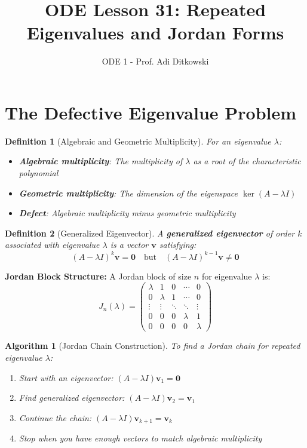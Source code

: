 \documentclass[12pt]{article}
\title{ODE Lesson 31: Repeated Eigenvalues and Jordan Forms}
\author{ODE 1 - Prof. Adi Ditkowski}
\date{}
\newtheorem{definition}{Definition}
\newtheorem{algorithm}{Algorithm}
\begin{document}
\maketitle

\section{The Defective Eigenvalue Problem}

\begin{definition}[Algebraic and Geometric Multiplicity]
For an eigenvalue $\lambda$:
\begin{itemize}
\item \textbf{Algebraic multiplicity}: The multiplicity of $\lambda$ as a root of the characteristic polynomial
\item \textbf{Geometric multiplicity}: The dimension of the eigenspace $\ker(A - \lambda I)$
\item \textbf{Defect}: Algebraic multiplicity minus geometric multiplicity
\end{itemize}
\end{definition}

\begin{definition}[Generalized Eigenvector]
A \textbf{generalized eigenvector} of order $k$ associated with eigenvalue $\lambda$ is a vector $\mathbf{v}$ satisfying:
\[(A - \lambda I)^{k} \mathbf{v} = \mathbf{0} \quad \text{but} \quad (A - \lambda I)^{k-1} \mathbf{v} \neq \mathbf{0}\]
\end{definition}

\begin{keypoint}
\textbf{Jordan Block Structure:}
A Jordan block of size $n$ for eigenvalue $\lambda$ is:
\[J_{n}(\lambda) = \begin{pmatrix}
\lambda & 1 & 0 & \cdots & 0 \\
0 & \lambda & 1 & \cdots & 0 \\
\vdots & \vdots & \ddots & \ddots & \vdots \\
0 & 0 & 0 & \lambda & 1 \\
0 & 0 & 0 & 0 & \lambda
\end{pmatrix}\]
\end{keypoint}

\begin{algorithm}[Jordan Chain Construction]
To find a Jordan chain for repeated eigenvalue $\lambda$:
\begin{enumerate}
\item Start with an eigenvector: $(A - \lambda I)\mathbf{v}_{1} = \mathbf{0}$
\item Find generalized eigenvector: $(A - \lambda I)\mathbf{v}_{2} = \mathbf{v}_{1}$
\item Continue the chain: $(A - \lambda I)\mathbf{v}_{k+1} = \mathbf{v}_{k}$
\item Stop when you have enough vectors to match algebraic multiplicity
\end{enumerate}
\end{algorithm}
\end{document}
